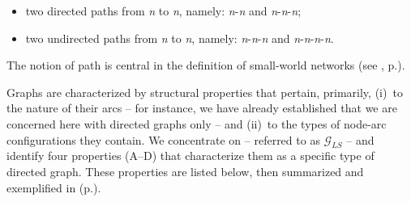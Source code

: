 \begin{itemize}

\item two directed paths from \textit{n} to \textit{n}, namely: \textit{n}-\textit{n} and \textit{n}-\textit{n}-\textit{n};

\item two undirected paths from \textit{n} to \textit{n}, namely: \textit{n}-\textit{n}-\textit{n} and \textit{n}-\textit{n}-\textit{n}-\textit{n}.

\end{itemize}

The notion of path is central in the definition of small-world networks (see , p.\thinspace\pageref{sec:smallWorldNetworks}).


Graphs are characterized by structural properties that pertain, primarily, (i)~to the nature of their arcs -- for instance, we have already established that we are concerned here with directed graphs only -- and (ii)~to the types of node-arc configurations they contain. We concentrate on  -- referred to as $\mathcal{G}_{LS}$ -- and identify four properties (A--D) that characterize them as a specific type of directed graph. These properties are listed below, then summarized and exemplified in  (p.\thinspace\pageref{fig:propertiesOfGLS}).

